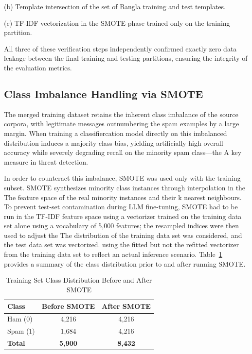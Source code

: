 \documentclass[journal]{IEEEtran}
\begin{document}
(b) Template intersection of the set of Bangla training and test
templates.

(c) TF-IDF vectorization in the SMOTE phase trained only on the
training partition.

All three of these verification steps independently confirmed exactly zero data leakage between the final training and testing partitions, ensuring the integrity of the evaluation metrics.

\subsection{Class Imbalance Handling via SMOTE}

The merged training dataset retains the inherent class
imbalance of the source corpora, with legitimate messages
outnumbering the spam examples by a large margin. When training a classifiercation model directly on this imbalanced distribution induces
a majority-class bias, yielding artificially high overall accuracy
while severely degrading recall on the minority spam class—the
A key measure in threat detection.

In order to counteract this imbalance, SMOTE was used only with the training subset.
SMOTE synthesizes minority class instances through interpolation in the
The feature space of the real minority instances and their k nearest neighbours.
To prevent test-set contamination during LLM fine-tuning, SMOTE had to be run in the TF-IDF feature space using a vectorizer
trained on the training data set alone using a vocabulary of 5,000
features; the resampled indices were then used to adjust the
The distribution of the training data set was considered, and the test data set was vectorized.
using the fitted but not the refitted vectorizer from the training data
set to reflect an actual inference scenario. Table~\ref{tab:smote} provides a summary
of the class distribution prior to and after running SMOTE.

\begin{table}[htbp]
\caption{Training Set Class Distribution Before and After SMOTE}
\label{tab:smote}
\centering
\begin{tabular}{lcc}
\toprule
\textbf{Class} & \textbf{Before SMOTE} & \textbf{After SMOTE} \\
\midrule
Ham (0) & 4,216 & 4,216 \\
Spam (1) & 1,684 & 4,216 \\
\textbf{Total} & \textbf{5,900} & \textbf{8,432} \\
\bottomrule
\end{tabular}
\end{table}
\end{document}
